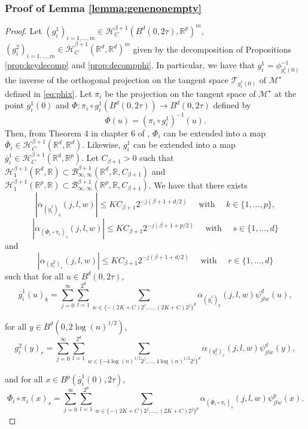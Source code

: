 \documentclass[10pt]{article}
\begin{document}
\subsubsection{Proof of Lemma \ref{lemma:genenonempty}}\label{sec:lemma:genenonempty}
\begin{proof}
    Let $(g_i^1)_{i=1,...,m}\in\mathcal{H}^{\beta+1}_{C}(B^d(0,2\tau),\mathbb{R}^p)^m$, $(g_i^2)_{i=1,...,m}\in\dot{\mathcal{H}}^{\beta+1}_{C}(\mathbb{R}^d,\mathbb{R}^d)^m$ given by the decomposition of Propositions \ref{prop:keydecomp} and \ref{prop:decompphi}. In particular, we have that $g_i^1=\phi_{g_i^1(0)}^{-1}$ the inverse of the orthogonal projection on the tangent space $\mathcal{T}_{g_i^1(0)}$ of $\mathcal{M}^\star$ defined in \eqref{eq:phix}. Let $\pi_i$ be the projection on the tangent space of $\mathcal{M}^\star$ at the point $g_i^1(0)$ and $\Phi: \pi_i \circ g_i^1(B^d(0,2\tau))\rightarrow B^d(0,2\tau)$ defined by 
    $$\Phi(u)=(\pi_i \circ g_i^1)^{-1}(u).$$
    Then, from Theorem 4 in chapter 6 of \cite{SingularStein}, $\Phi_i$ can be extended into a map $\overline{\Phi}_i\in \mathcal{H}^{\beta+1}_C(\mathbb{R}^d,\mathbb{R}^d)$. Likewise, $g_i^1$ can be extended into a map $\overline{g}_i^1\in \mathcal{H}^{\beta+1}_C(\mathbb{R}^d,\mathbb{R}^p)$. Let $C_{\beta+1}>0$  such that $\mathcal{H}_1^{\beta+1}(\mathbb{R}^d,\mathbb{R})\subset \mathcal{B}_{\infty,\infty}^{\beta+1}(\mathbb{R}^d,\mathbb{R},C_{\beta+1})$ and $\mathcal{H}_1^{\beta+1}(\mathbb{R}^p,\mathbb{R})\subset \mathcal{B}_{\infty,\infty}^{\beta+1}(\mathbb{R}^p,\mathbb{R},C_{\beta+1})$. We have that there exists  $$|\alpha_{(\overline{g}_i^1)_k}(j,l,w)|\leq KC_{\beta+1} 2^{-j(\beta+1+d/2)}\quad \text{ with }\quad k\in \{1,...,p\},$$ $$|\alpha_{(\overline{\Phi}_i\circ\pi_i)_s}(j,l,w)|\leq KC_{\beta+1} 2^{-j(\beta+1+p/2)}\quad \text{ with }\quad s\in \{1,...,d\}$$ and $$|\alpha_{(g_i^2)_r}(j,l,w)|\leq KC_{\beta+1} 2^{-j(\beta+1+d/2)}\quad \text{ with }\quad r\in \{1,...,d\}$$
    such that
for all $u\in B^d(0,2\tau)$,
    $$\overline{g}_i^1(u)_k=\sum \limits_{j=0}^{\infty} \sum \limits_{l=1}^{2^d} \sum \limits_{w\in \{-(2K+C)2^j,...,(2K+C)2^j\}^d} \alpha_{(\overline{g}_i^1)_k}(j,l,w)\psi^d_{jlw}(u),$$
    
for all $y\in B^d(0,2\log(n)^{1/2})$,
    $$g_i^2(y)_r=\sum \limits_{j=0}^{\infty} \sum \limits_{l=1}^{2^d} \sum \limits_{w\in \{-4\log(n)^{1/2}2^j,...,4\log(n)^{1/2}2^j\}^d} \alpha_{(g_i^2)_r}(j,l,w)\psi^d_{jlw}(y),$$

and for all $x\in B^p(\overline{g}_i^1(0),2\tau)$,
$$\overline{\Phi}_i\circ\pi_i(x)_s=\sum \limits_{j=0}^{\infty} \sum \limits_{l=1}^{2^p} \sum \limits_{w\in \{-(2K+C)2^j,...,(2K+C)2^j\}^p} \alpha_{(\overline{\Phi}_i\circ\pi_i)_s}(j,l,w)\psi^p_{jlw}(x).$$


\end{proof}
\end{document}
